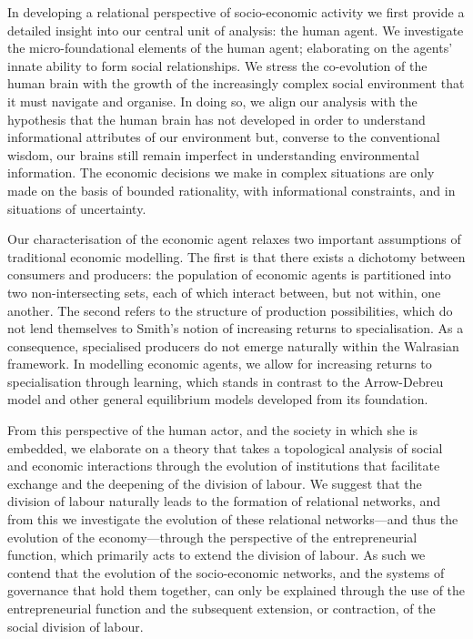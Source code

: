 \medskip\noindent In developing a relational perspective of socio-economic activity we first provide a detailed insight into our central unit of analysis: the human agent. We investigate the micro-foundational elements of the human agent; elaborating on the agents' innate ability to form social relationships. We stress the co-evolution of the human brain with the growth of the increasingly complex social environment that it must navigate and organise. In doing so, we align our analysis with the hypothesis that the human brain has not developed in order to understand informational attributes of our environment but, converse to the conventional wisdom, our brains still remain imperfect in understanding environmental information. The economic decisions we make in complex situations are only made on the basis of bounded rationality, with informational constraints, and in situations of uncertainty.

Our characterisation of the economic agent relaxes two important assumptions of traditional economic modelling. The first is that there exists a dichotomy between consumers and producers: the population of economic agents is partitioned into two non-intersecting sets, each of which interact between, but not within, one another. The second refers to the structure of production possibilities, which do not lend themselves to Smith's notion of increasing returns to specialisation. As a consequence, specialised producers do not emerge naturally within the Walrasian framework. In modelling economic agents, we allow for increasing returns to specialisation through learning, which stands in contrast to the Arrow-Debreu model and other general equilibrium models developed from its foundation.

From this perspective of the human actor, and the society in which she is embedded, we elaborate on a theory that takes a topological analysis of social and economic interactions through the evolution of institutions that facilitate exchange and the deepening of the division of labour. We suggest that the division of labour naturally leads to the formation of relational networks, and from this we investigate the evolution of these relational networks---and thus the evolution of the economy---through the perspective of the entrepreneurial function, which primarily acts to extend the division of labour. As such we contend that the evolution of the socio-economic networks, and the systems of governance that hold them together, can only be explained through the use of the entrepreneurial function and the subsequent extension, or contraction, of the social division of labour.

